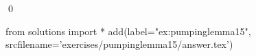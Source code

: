 
\begin{ex} 
  \label{ex:pumpinglemma15}
  
  \qed
\end{ex} 
\begin{python0}
from solutions import *
add(label="ex:pumpinglemma15",
    srcfilename='exercises/pumpinglemma15/answer.tex') 
\end{python0}

